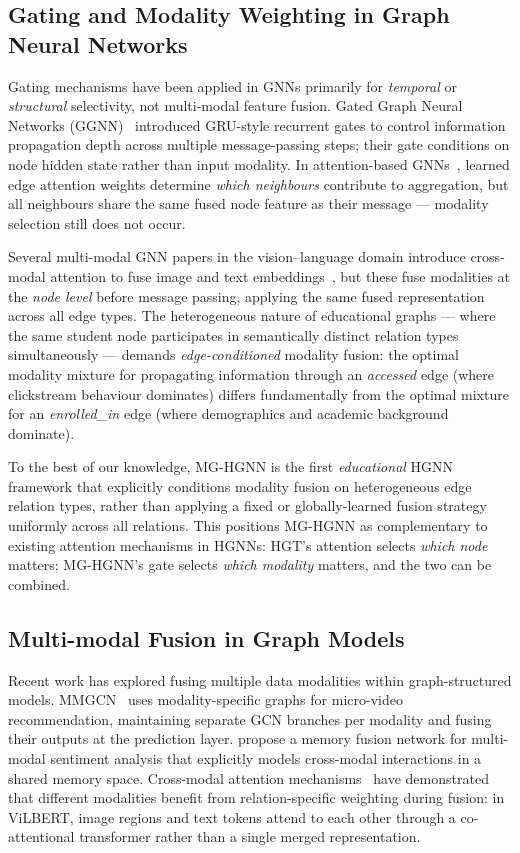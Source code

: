 \documentclass[sigconf,review]{acmart}
\begin{document}
\subsection{Gating and Modality Weighting in Graph Neural Networks}

Gating mechanisms have been applied in GNNs primarily for
\emph{temporal} or \emph{structural} selectivity, not
multi-modal feature fusion. Gated Graph Neural Networks
(GGNN)~\citep{li2015gated} introduced GRU-style recurrent
gates to control information propagation depth across
multiple message-passing steps; their gate conditions on
node hidden state rather than input modality. In
attention-based GNNs~\citep{velivckovic2018graph,
hu2020heterogeneous}, learned edge attention weights
determine \emph{which neighbours} contribute to aggregation,
but all neighbours share the same fused node feature as
their message --- modality selection still does not occur.

Several multi-modal GNN papers in the vision--language domain
introduce cross-modal attention to fuse image and text
embeddings~\citep{yang2024hypergraph}, but these fuse
modalities at the \emph{node level} before message passing,
applying the same fused representation across all edge types.
The heterogeneous nature of educational graphs --- where the
same student node participates in semantically distinct
relation types simultaneously --- demands
\emph{edge-conditioned} modality fusion: the optimal modality
mixture for propagating information through an
\textit{accessed} edge (where clickstream behaviour dominates)
differs fundamentally from the optimal mixture for an
\textit{enrolled\_in} edge (where demographics and academic
background dominate).

To the best of our knowledge, MG-HGNN is the first
\emph{educational} HGNN framework that explicitly
conditions modality fusion on heterogeneous edge
relation types, rather than applying a fixed or
globally-learned fusion strategy uniformly across all
relations. This positions MG-HGNN as complementary to
existing attention mechanisms in HGNNs: HGT's attention
selects \emph{which node} matters; MG-HGNN's gate selects
\emph{which modality} matters, and the two can be combined.

\subsection{Multi-modal Fusion in Graph Models}

Recent work has explored fusing multiple data modalities
within graph-structured models.
MMGCN~\citep{wei2019mmgcn} uses modality-specific graphs
for micro-video recommendation, maintaining separate
GCN branches per modality and fusing their outputs at
the prediction layer.
\citet{zadeh2018multimodal} propose a memory fusion
network for multi-modal sentiment analysis that
explicitly models cross-modal interactions in a shared
memory space.
Cross-modal attention mechanisms~\citep{lu2019vilbert}
have demonstrated that different modalities benefit from
relation-specific weighting during fusion: in ViLBERT,
image regions and text tokens attend to each other
through a co-attentional transformer rather than a
single merged representation.
\end{document}
